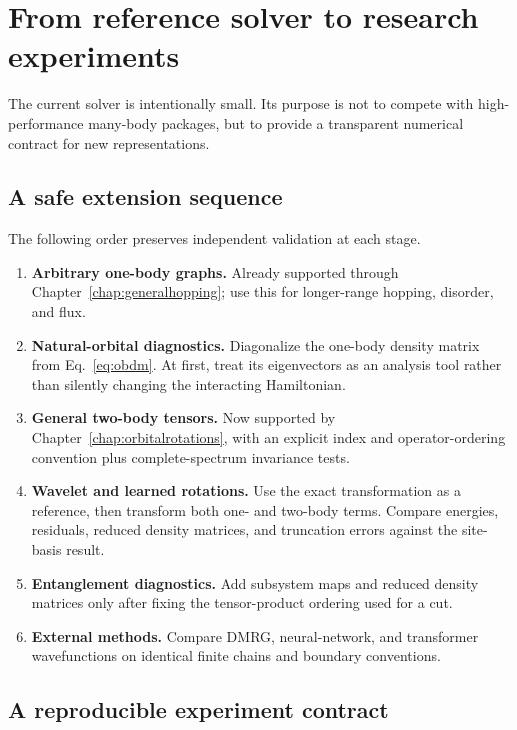 \chapter{From reference solver to research experiments}
\label{chap:extensions}

The current solver is intentionally small.  Its purpose is not to compete with
high-performance many-body packages, but to provide a transparent numerical
contract for new representations.

\section{A safe extension sequence}

The following order preserves independent validation at each stage.
\begin{enumerate}
\item \textbf{Arbitrary one-body graphs.}  Already supported through
      Chapter~\ref{chap:generalhopping}; use this for longer-range hopping, disorder,
      and flux.
\item \textbf{Natural-orbital diagnostics.}  Diagonalize the one-body density
      matrix from Eq.~\eqref{eq:obdm}.  At first, treat its eigenvectors as an
      analysis tool rather than silently changing the interacting Hamiltonian.
\item \textbf{General two-body tensors.}  Now supported by
      Chapter~\ref{chap:orbitalrotations}, with an explicit index and
      operator-ordering convention plus complete-spectrum invariance tests.
\item \textbf{Wavelet and learned rotations.}  Use the exact transformation as
      a reference, then transform both one- and two-body
      terms.  Compare energies, residuals, reduced density matrices, and
      truncation errors against the site-basis result.
\item \textbf{Entanglement diagnostics.}  Add subsystem maps and reduced density
      matrices only after fixing the tensor-product ordering used for a cut.
\item \textbf{External methods.}  Compare DMRG, neural-network, and transformer
      wavefunctions on identical finite chains and boundary conventions.
\end{enumerate}

\section{A reproducible experiment contract}

